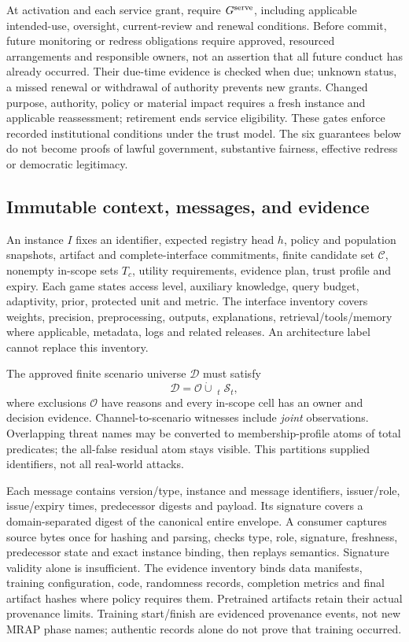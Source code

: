 At activation and each service grant, require $G^{\rm serve}$, including
applicable intended-use, oversight, current-review and renewal conditions.
Before commit, future monitoring or redress obligations require approved,
resourced arrangements and responsible owners, not an assertion that all
future conduct has already occurred. Their due-time evidence is checked when
due; unknown status, a missed renewal or withdrawal of authority prevents new
grants. Changed purpose, authority, policy or material impact requires a fresh
instance and applicable reassessment; retirement ends service eligibility.
These gates enforce recorded institutional conditions under the trust model.
The six guarantees below do not become proofs of lawful government,
substantive fairness, effective redress or democratic legitimacy.

\subsection{Immutable context, messages, and evidence}
An instance $I$ fixes an identifier, expected registry head $h$, policy and
population snapshots, artifact and complete-interface commitments, finite
candidate set $\mathcal C$, nonempty in-scope sets $T_c$, utility requirements,
evidence plan, trust profile and expiry. Each game states access level,
auxiliary knowledge, query budget, adaptivity, prior, protected unit and metric.
The interface inventory covers weights, precision, preprocessing, outputs,
explanations, retrieval/tools/memory where applicable, metadata, logs and
related releases. An architecture label cannot replace this inventory.

The approved finite scenario universe $\mathcal D$ must satisfy
\[
 \mathcal D=\mathcal O\mathbin{\dot\cup}
                 \mathop{\dot\bigcup}_{t}\mathcal S_t,
\]
where exclusions $\mathcal O$ have reasons and every in-scope cell has an owner
and decision evidence. Channel-to-scenario witnesses include \emph{joint}
observations. Overlapping threat names may be converted to membership-profile
atoms of total predicates; the all-false residual atom stays visible.
This partitions supplied identifiers, not all real-world attacks.

Each message contains version/type, instance and message identifiers,
issuer/role, issue/expiry times, predecessor digests and payload. Its signature
covers a domain-separated digest of the canonical entire envelope. A consumer
captures source bytes once for hashing and parsing, checks type, role,
signature, freshness, predecessor state and exact instance binding, then
replays semantics. Signature validity alone is insufficient.
The evidence inventory binds data manifests, training configuration, code,
randomness records, completion metrics and final artifact hashes where policy
requires them. Pretrained artifacts retain their actual provenance limits.
Training start/finish are evidenced provenance events, not new MRAP phase
names; authentic records alone do not prove that training occurred.

